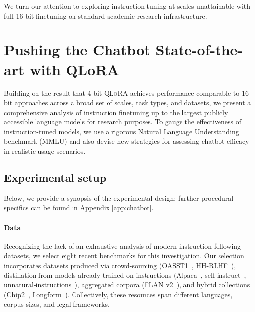 We turn our attention to exploring instruction tuning at scales unattainable with full 16-bit finetuning on standard academic research infrastructure.

\section{Pushing the Chatbot State-of-the-art with QLoRA}
\label{sec:pushing}
Building on the result that 4-bit \textsc{QLoRA} achieves performance comparable to 16-bit approaches across a broad set of scales, task types, and datasets, we present a comprehensive analysis of instruction finetuning up to the largest publicly accessible language models for research purposes. To gauge the effectiveness of instruction-tuned models, we use a rigorous Natural Language Understanding benchmark (MMLU) and also devise new strategies for assessing chatbot efficacy in realistic usage scenarios.

\subsection{Experimental setup} Below, we provide a synopsis of the experimental design; further procedural specifics can be found in Appendix \ref{app:chatbot}. 

\paragraph{Data} Recognizing the lack of an exhaustive analysis of modern instruction-following datasets, we select eight recent benchmarks for this investigation. Our selection incorporates datasets produced via crowd-sourcing (OASST1~\citep{kopf2023openassistant}, HH-RLHF~\citep{bai2022training}), distillation from models already trained on instructions (Alpaca~\citep{alpaca}, self-instruct~\citep{wang2022self}, unnatural-instructions~\citep{honovich2022unnatural}), aggregated corpora (FLAN v2~\citep{chung2022scaling}), and hybrid collections (Chip2~\citep{laion2023}, Longform~\citep{koksal2023longform}). Collectively, these resources span different languages, corpus sizes, and legal frameworks.

